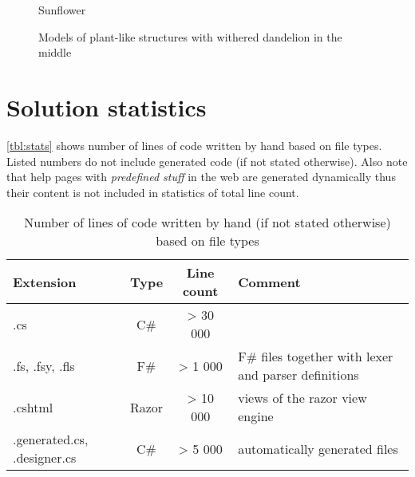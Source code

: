 \begin{figure}[p]
	\centering
	\caption{Sunflower}
\end{figure}

\begin{figure}[p]
	\hfill
	\hfill
	\caption{Models of plant-like structures with withered dandelion in the middle}
\end{figure}



\section{Solution statistics}

\autoref{tbl:stats} shows number of lines of code written by hand based on file types.
Listed numbers do not include generated code (if not stated otherwise).
Also note that help pages with \emph{predefined stuff} in the web are generated dynamically thus their content is not included in statistics of total line count.


\begin{table}[h]
	\centering
	\begin{tabular}{p{65pt} c c p{200pt}}
   		\toprule
   		Extension & Type & Line count & Comment\\
   		\midrule
		.cs & C\# & > 30 000 &  \\ \hline
		.fs, .fsy, .fls & F\# & > 1 000 & F\# files together with lexer and parser definitions \\ \hline
		.cshtml & Razor & > 10 000 & views of the razor view engine\\ \hline
		.generated.cs, .designer.cs & C\# & > 5 000 & automatically generated files \\
		\bottomrule
	\end{tabular}
	\caption{Number of lines of code written by hand (if not stated otherwise) based on file types}
	\label{tbl:stats}
\end{table}























